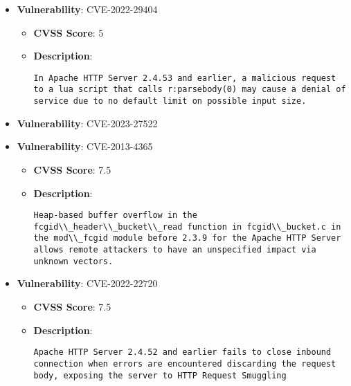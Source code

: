 \documentclass{article}
\begin{document}
\begin{itemize}
        \item \textbf{Vulnerability}: CVE-2022-29404
        \begin{itemize}
            \item \textbf{CVSS Score}:  5 
            \item \textbf{Description}:
            \parbox[t]{0.9\linewidth}{
                \verb|In Apache HTTP Server 2.4.53 and earlier, a malicious request to a lua script that calls r:parsebody(0) may cause a denial of service due to no default limit on possible input size.|
            }
        \end{itemize}
    
        \item \textbf{Vulnerability}: CVE-2023-27522
    
        \item \textbf{Vulnerability}: CVE-2013-4365
        \begin{itemize}
            \item \textbf{CVSS Score}:  7.5 
            \item \textbf{Description}:
            \parbox[t]{0.9\linewidth}{
                \verb|Heap-based buffer overflow in the fcgid\\_header\\_bucket\\_read function in fcgid\\_bucket.c in the mod\\_fcgid module before 2.3.9 for the Apache HTTP Server allows remote attackers to have an unspecified impact via unknown vectors.|
            }
        \end{itemize}
    
        \item \textbf{Vulnerability}: CVE-2022-22720
        \begin{itemize}
            \item \textbf{CVSS Score}:  7.5 
            \item \textbf{Description}:
            \parbox[t]{0.9\linewidth}{
                \verb|Apache HTTP Server 2.4.52 and earlier fails to close inbound connection when errors are encountered discarding the request body, exposing the server to HTTP Request Smuggling|
            }
        \end{itemize}
    

\end{itemize}
\end{document}
